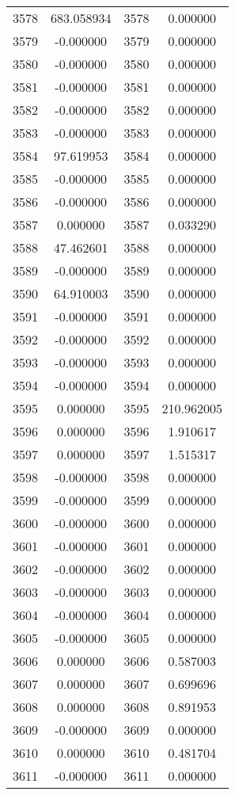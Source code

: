 \documentclass[12pt]{article}
\begin{document}
\begin{longtable}{@{}cccc@{}}
3578 & 683.058934 & 3578 & 0.000000 \\
3579 & -0.000000 & 3579 & 0.000000 \\
3580 & -0.000000 & 3580 & 0.000000 \\
3581 & -0.000000 & 3581 & 0.000000 \\
3582 & -0.000000 & 3582 & 0.000000 \\
3583 & -0.000000 & 3583 & 0.000000 \\
3584 & 97.619953 & 3584 & 0.000000 \\
3585 & -0.000000 & 3585 & 0.000000 \\
3586 & -0.000000 & 3586 & 0.000000 \\
3587 & 0.000000 & 3587 & 0.033290 \\
3588 & 47.462601 & 3588 & 0.000000 \\
3589 & -0.000000 & 3589 & 0.000000 \\
3590 & 64.910003 & 3590 & 0.000000 \\
3591 & -0.000000 & 3591 & 0.000000 \\
3592 & -0.000000 & 3592 & 0.000000 \\
3593 & -0.000000 & 3593 & 0.000000 \\
3594 & -0.000000 & 3594 & 0.000000 \\
3595 & 0.000000 & 3595 & 210.962005 \\
3596 & 0.000000 & 3596 & 1.910617 \\
3597 & 0.000000 & 3597 & 1.515317 \\
3598 & -0.000000 & 3598 & 0.000000 \\
3599 & -0.000000 & 3599 & 0.000000 \\
3600 & -0.000000 & 3600 & 0.000000 \\
3601 & -0.000000 & 3601 & 0.000000 \\
3602 & -0.000000 & 3602 & 0.000000 \\
3603 & -0.000000 & 3603 & 0.000000 \\
3604 & -0.000000 & 3604 & 0.000000 \\
3605 & -0.000000 & 3605 & 0.000000 \\
3606 & 0.000000 & 3606 & 0.587003 \\
3607 & 0.000000 & 3607 & 0.699696 \\
3608 & 0.000000 & 3608 & 0.891953 \\
3609 & -0.000000 & 3609 & 0.000000 \\
3610 & 0.000000 & 3610 & 0.481704 \\
3611 & -0.000000 & 3611 & 0.000000 \\

\end{longtable}
\end{document}
